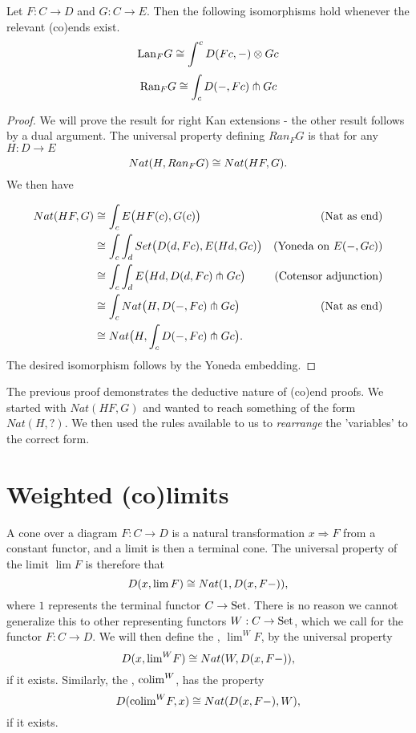 \begin{proposition}\label{prop:kan-is-end}
Let $F:C\rightarrow D$ and $G:C\rightarrow E$. Then the following isomorphisms hold whenever the relevant (co)ends exist.
$$\text{Lan}_FG\cong\int^cD(Fc,-)\otimes Gc$$
$$\text{Ran}_FG\cong \int_c D(-,Fc)\pitchfork Gc$$\end{proposition}
\begin{proof} We will prove the result for right Kan extensions - the other result follows by a dual argument. The universal property defining $Ran_FG$ is that for any $H:D\rightarrow E$
$$Nat(H,Ran_FG)\cong Nat(HF,G).$$ We then have

\begin{align*}
Nat(HF,G) & \cong \int_c E\big(HF(c),G(c)\big)& \text{(Nat as end)}\\
& \cong \int_c \int_d Set\big( D(d,Fc),E(Hd,Gc)\big)& \text{(Yoneda on $E(-,Gc)$)}\\
 & \cong \int_c \int_dE\big(Hd,D(d,Fc)\pitchfork Gc\big) & \text{(Cotensor adjunction)}\\
 & \cong \int_c Nat\big(H,D(-,Fc)\pitchfork Gc\big) & \text{(Nat as end)}\\
 & \cong  Nat\big(H,\int_cD(-,Fc)\pitchfork Gc\big). &
\end{align*}
The desired isomorphism follows by the Yoneda embedding.\end{proof}

The previous proof demonstrates the deductive nature of (co)end proofs. We started with $Nat(HF,G)$ and wanted to reach something of the form $Nat(H,?)$. We then used the rules available to us to \textit{rearrange} the 'variables' to the correct form. 

\section{Weighted (co)limits}\label{sec:weighted-colimits}
A cone over a diagram $F:C\rightarrow D$ is a natural transformation $x\Rightarrow F$ from a constant functor, and a limit is then a terminal cone. The universal property of the limit $\lim F$ is therefore that $$D(x,\lim F)\cong Nat(1,D(x,F-)),$$
where $1$ represents the terminal functor $C\rightarrow {\text{Set}}$. There is no reason we cannot generalize this to other representing functors $W:C\rightarrow {\text{Set}}$, which we call  for the functor $F:C\rightarrow D$. We will then define the , $\lim^WF$, by the universal property
$$D(x,\text{lim}^{W} F)\cong Nat(W,D(x,F-)),$$
if it exists. Similarly, the , $\text{colim}^W$, has the property
$$D(\text{colim}^{W} F,x)\cong Nat(D(x,F-),W),$$
if it exists. 

